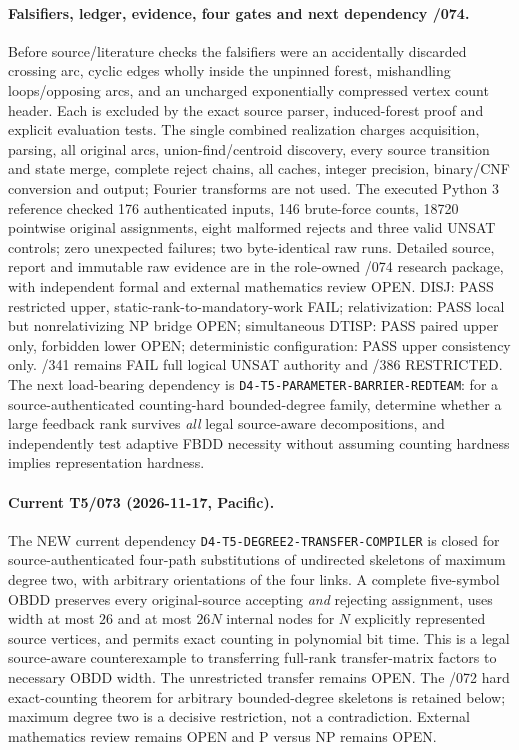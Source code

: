 \documentclass[11pt]{article}
\begin{document}
\paragraph{Falsifiers, ledger, evidence, four gates and next dependency /074.}
Before source/literature checks the falsifiers were an accidentally
discarded crossing arc, cyclic edges wholly inside the unpinned forest,
mishandling loops/opposing arcs, and an uncharged exponentially
compressed vertex count header. Each is excluded by the exact source
parser, induced-forest proof and explicit evaluation tests.
The single combined realization charges acquisition, parsing,
all original arcs, union-find/centroid discovery, every source
transition and state merge, complete reject chains, all caches,
integer precision, binary/CNF conversion and output; Fourier
transforms are not used. The executed Python 3 reference checked
176 authenticated inputs, 146 brute-force counts, 18720 pointwise
original assignments, eight malformed rejects and three valid
UNSAT controls; zero unexpected failures; two byte-identical raw
runs. Detailed source, report and immutable raw evidence are
in the role-owned /074 research package, with independent formal
and external mathematics review OPEN. DISJ: PASS restricted upper,
static-rank-to-mandatory-work FAIL; relativization: PASS local but
nonrelativizing NP bridge OPEN; simultaneous DTISP: PASS paired
upper only, forbidden lower OPEN; deterministic configuration:
PASS upper consistency only. /341 remains FAIL full logical
UNSAT authority and /386 RESTRICTED.
The next load-bearing dependency is
\texttt{D4-T5-PARAMETER-BARRIER-REDTEAM}: for a source-authenticated
counting-hard bounded-degree family, determine whether a large
feedback rank survives \emph{all} legal source-aware decompositions,
and independently test adaptive FBDD necessity without assuming
counting hardness implies representation hardness.



\paragraph{Current T5/073 (2026-11-17, Pacific).}
The NEW current dependency \texttt{D4-T5-DEGREE2-TRANSFER-COMPILER}
is closed for source-authenticated four-path substitutions of
undirected skeletons of maximum degree two, with arbitrary
orientations of the four links. A complete five-symbol OBDD
preserves every original-source accepting \emph{and} rejecting
assignment, uses width at most $26$ and at most $26N$ internal nodes
for $N$ explicitly represented source vertices, and permits exact
counting in polynomial bit time. This is a legal source-aware
counterexample to transferring full-rank transfer-matrix factors
to necessary OBDD width. The unrestricted transfer remains OPEN.
The /072 hard exact-counting theorem for arbitrary bounded-degree
skeletons is retained below; maximum degree two is a decisive
restriction, not a contradiction. External mathematics review
remains OPEN and P versus NP remains OPEN.
\end{document}
